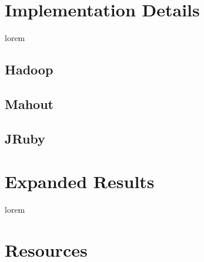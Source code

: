 
\chapter{Implementation Details}

lorem

\section{Hadoop}
\section{Mahout}
\section{JRuby}

\chapter{Expanded Results}

lorem


\chapter{Resources}
